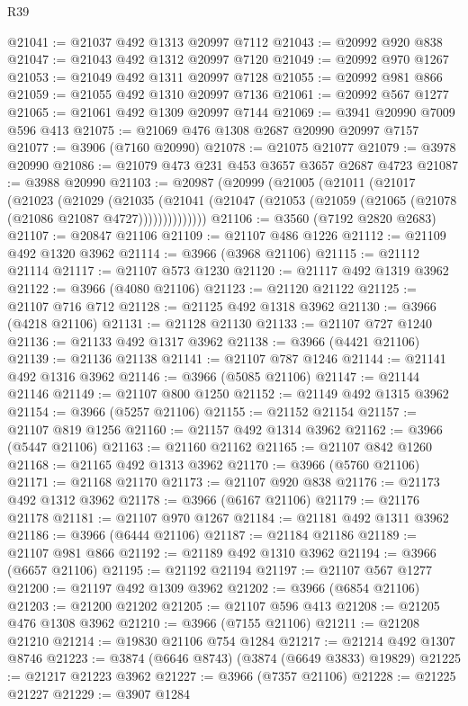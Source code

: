 \begin{lexlean}{R39}
\begin{coremodule}
@21041 := @21037 @492 @1313 @20997 @7112
@21043 := @20992 @920 @838
@21047 := @21043 @492 @1312 @20997 @7120
@21049 := @20992 @970 @1267
@21053 := @21049 @492 @1311 @20997 @7128
@21055 := @20992 @981 @866
@21059 := @21055 @492 @1310 @20997 @7136
@21061 := @20992 @567 @1277
@21065 := @21061 @492 @1309 @20997 @7144
@21069 := @3941 @20990 @7009 @596 @413
@21075 := @21069 @476 @1308 @2687 @20990 @20997 @7157
@21077 := @3906 (@7160 @20990)
@21078 := @21075 @21077
@21079 := @3978 @20990
@21086 := @21079 @473 @231 @453 @3657 @3657 @2687 @4723
@21087 := @3988 @20990
@21103 := @20987
    (@20999
      (@21005
        (@21011
          (@21017
            (@21023
              (@21029
                (@21035
                  (@21041 (@21047 (@21053 (@21059 (@21065 (@21078 (@21086 @21087 @4727))))))))))))))
@21106 := @3560 (@7192 @2820 @2683)
@21107 := @20847 @21106
@21109 := @21107 @486 @1226
@21112 := @21109 @492 @1320 @3962
@21114 := @3966 (@3968 @21106)
@21115 := @21112 @21114
@21117 := @21107 @573 @1230
@21120 := @21117 @492 @1319 @3962
@21122 := @3966 (@4080 @21106)
@21123 := @21120 @21122
@21125 := @21107 @716 @712
@21128 := @21125 @492 @1318 @3962
@21130 := @3966 (@4218 @21106)
@21131 := @21128 @21130
@21133 := @21107 @727 @1240
@21136 := @21133 @492 @1317 @3962
@21138 := @3966 (@4421 @21106)
@21139 := @21136 @21138
@21141 := @21107 @787 @1246
@21144 := @21141 @492 @1316 @3962
@21146 := @3966 (@5085 @21106)
@21147 := @21144 @21146
@21149 := @21107 @800 @1250
@21152 := @21149 @492 @1315 @3962
@21154 := @3966 (@5257 @21106)
@21155 := @21152 @21154
@21157 := @21107 @819 @1256
@21160 := @21157 @492 @1314 @3962
@21162 := @3966 (@5447 @21106)
@21163 := @21160 @21162
@21165 := @21107 @842 @1260
@21168 := @21165 @492 @1313 @3962
@21170 := @3966 (@5760 @21106)
@21171 := @21168 @21170
@21173 := @21107 @920 @838
@21176 := @21173 @492 @1312 @3962
@21178 := @3966 (@6167 @21106)
@21179 := @21176 @21178
@21181 := @21107 @970 @1267
@21184 := @21181 @492 @1311 @3962
@21186 := @3966 (@6444 @21106)
@21187 := @21184 @21186
@21189 := @21107 @981 @866
@21192 := @21189 @492 @1310 @3962
@21194 := @3966 (@6657 @21106)
@21195 := @21192 @21194
@21197 := @21107 @567 @1277
@21200 := @21197 @492 @1309 @3962
@21202 := @3966 (@6854 @21106)
@21203 := @21200 @21202
@21205 := @21107 @596 @413
@21208 := @21205 @476 @1308 @3962
@21210 := @3966 (@7155 @21106)
@21211 := @21208 @21210
@21214 := @19830 @21106 @754 @1284
@21217 := @21214 @492 @1307 @8746
@21223 := @3874 (@6646 @8743) (@3874 (@6649 @3833) @19829)
@21225 := @21217 @21223 @3962
@21227 := @3966 (@7357 @21106)
@21228 := @21225 @21227
@21229 := @3907 @1284

\end{coremodule}
\end{lexlean}
